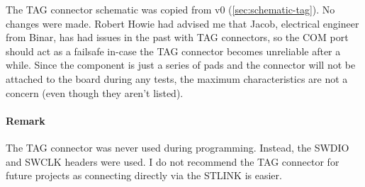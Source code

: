 The TAG connector schematic was copied from v0 (\autoref{sec:schematic-tag}). No changes were made. Robert Howie had advised me that Jacob, electrical engineer from Binar, has had issues in the past with TAG connectors, so the COM port should act as a failsafe in-case the TAG connector becomes unreliable after a while.
\nl
Since the component is just a series of pads and the connector will not be attached to the board during any tests, the maximum characteristics are not a concern (even though they aren't listed).

\paragraph{Remark}\label{sec:v0.1-tag-remark}
The TAG connector was never used during programming. Instead, the SWDIO and SWCLK headers were used. I do not recommend the TAG connector for future projects as connecting directly via the STLINK is easier.